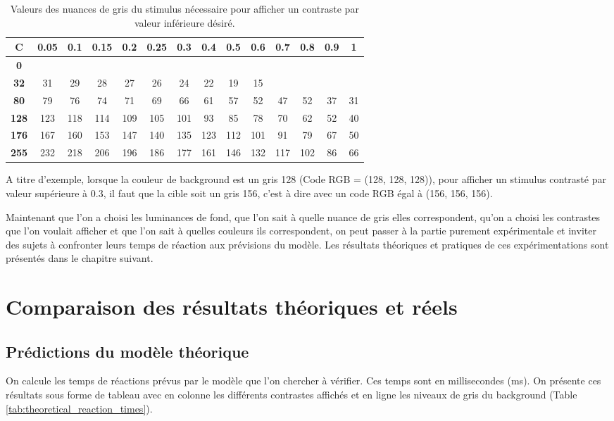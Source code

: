 	\begin{table}[h]	
		\centering
		\caption{Valeurs des nuances de gris du stimulus nécessaire pour afficher un contraste par valeur inférieure désiré.}
		\label{tab:contraste_inf}
		\begin{tabular}{c|ccccccccccccc}
			\textbf{C} & \textbf{0.05} & \textbf{0.1} & \textbf{0.15} & \textbf{0.2} & \textbf{0.25} & \textbf{0.3} & \textbf{0.4} & \textbf{0.5} & \textbf{0.6} & \textbf{0.7} & \textbf{0.8} & \textbf{0.9} & \textbf{1}\\
			\hline
			\textbf{0}\\
			\textbf{32} & 31 & 29 & 28 & 27 & 26 & 24 & 22 & 19 & 15\\
			\textbf{80} & 79 & 76 & 74 & 71 & 69 & 66 & 61 & 57 & 52 & 47 & 52 & 37 & 31\\
			\textbf{128} & 123 & 118 & 114 & 109 & 105 & 101 & 93 & 85 & 78 & 70 & 62 & 52 & 40\\
			\textbf{176} & 167 & 160 & 153 & 147 & 140 & 135 & 123 & 112 & 101 & 91 & 79 & 67 & 50\\
			\textbf{255} & 232 & 218 & 206 & 196 & 186 & 177 & 161 & 146 & 132 & 117 & 102 & 86 & 66\\
		\end{tabular}
	\end{table}
	
	\par A titre d'exemple, lorsque la couleur de background est un gris 128 (Code RGB = (128, 128, 128)), pour afficher un stimulus contrasté par valeur supérieure à 0.3, il faut que la cible soit un gris 156, c'est à dire avec un code RGB égal à (156, 156, 156). 
	
	\par Maintenant que l'on a choisi les luminances de fond, que l'on sait à quelle nuance de gris elles correspondent, qu'on a choisi les contrastes que l'on voulait afficher et que l'on sait à quelles couleurs ils correspondent, on peut passer à la partie purement expérimentale et inviter des sujets à confronter leurs temps de réaction aux prévisions du modèle. Les résultats théoriques et pratiques de ces expérimentations sont présentés dans le chapitre suivant.
	
\chapter{Comparaison des résultats théoriques et réels}
	\section{Prédictions du modèle théorique}
	\par On calcule les temps de réactions prévus par le modèle que l'on chercher à vérifier. Ces temps sont en millisecondes (ms). On présente ces résultats sous forme de tableau avec en colonne les différents contrastes affichés et en ligne les niveaux de gris du background (Table \ref{tab:theoretical_reaction_times}).
	
